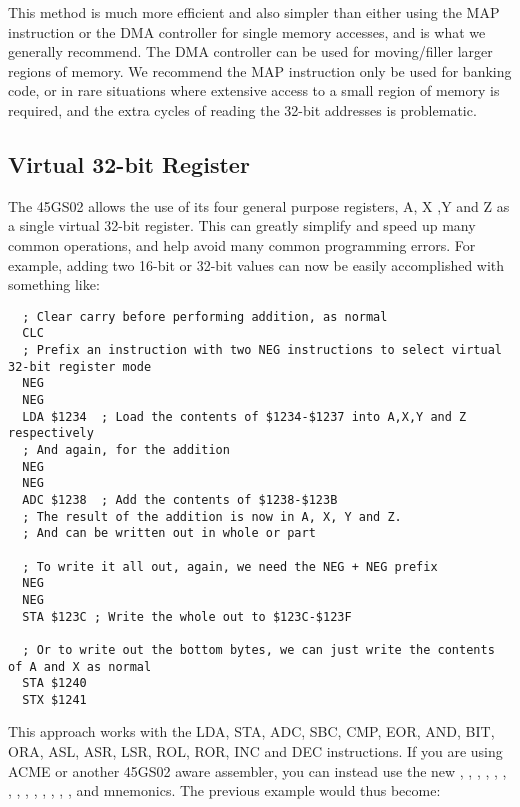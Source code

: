 This method is much more efficient and also simpler than either using the MAP instruction or the DMA controller for single memory accesses,
and is what we generally recommend.  The DMA controller can be used for moving/filler larger regions of memory.
We recommend the MAP instruction only be used for banking code, or in rare situations where extensive access to a small region of
memory is required, and the extra cycles of reading the 32-bit addresses is problematic.

\subsection{Virtual 32-bit Register}

The 45GS02 allows the use of its four general purpose registers, A, X ,Y and Z as a single virtual 32-bit register. This can greatly
simplify and speed up many common operations, and help avoid many common programming errors.
For example, adding two 16-bit or 32-bit values can now be easily accomplished with something like:

\begin{tcolorbox}[colback=black,coltext=white]
\verbatimfont{\codefont}
\begin{verbatim}
  ; Clear carry before performing addition, as normal
  CLC
  ; Prefix an instruction with two NEG instructions to select virtual 32-bit register mode
  NEG
  NEG
  LDA $1234  ; Load the contents of $1234-$1237 into A,X,Y and Z respectively
  ; And again, for the addition
  NEG
  NEG
  ADC $1238  ; Add the contents of $1238-$123B
  ; The result of the addition is now in A, X, Y and Z.
  ; And can be written out in whole or part

  ; To write it all out, again, we need the NEG + NEG prefix
  NEG
  NEG
  STA $123C ; Write the whole out to $123C-$123F

  ; Or to write out the bottom bytes, we can just write the contents of A and X as normal
  STA $1240
  STX $1241
\end{verbatim}
\end{tcolorbox}

This approach works with the LDA, STA, ADC, SBC, CMP, EOR, AND, BIT, ORA, ASL, ASR, LSR, ROL, ROR, INC and DEC instructions.
If you are using ACME or another 45GS02 aware assembler, you can instead use the new , , ,
, , , , , , , , , , ,  and 
mnemonics. The previous example would thus become:

